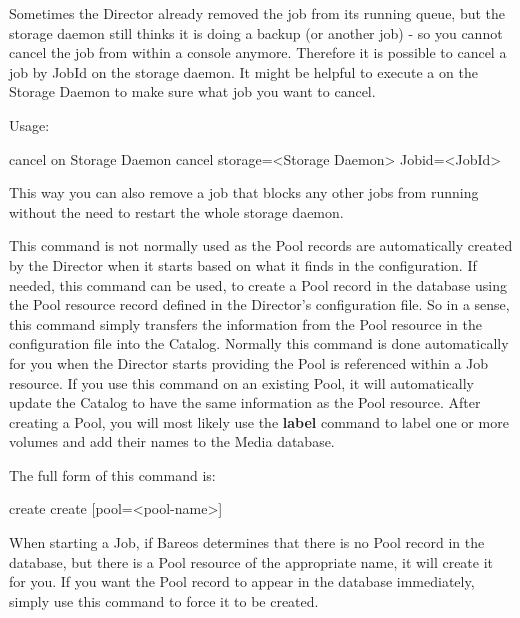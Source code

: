 \begin{description}
   Sometimes the Director already removed the job from its running queue, but the storage daemon still thinks it is doing a backup (or another job) - so you cannot cancel the job from within a console anymore. Therefore it is possible to cancel a job by JobId on the storage daemon. It might be helpful to execute a  on the Storage Daemon to make sure what job you want to cancel.

   Usage:
\begin{bconsole}{cancel on Storage Daemon}
cancel storage=<Storage Daemon> Jobid=<JobId>
\end{bconsole}

   This way you can also remove a job that blocks any other jobs from running without the need to restart the whole storage daemon.

\item [create]
   This command is not normally used as the Pool records are automatically
   created by the Director when it starts based on what it finds in
   the configuration.  If needed, this command can be used,
   to create a Pool record in the database using the
   Pool resource record defined in the Director's configuration file.  So
   in a sense, this command simply transfers the information from the Pool
   resource in the configuration file into the Catalog.  Normally this
   command is done automatically for you when the Director starts providing
   the Pool is referenced within a Job resource.  If you use this command
   on an existing Pool, it will automatically update the Catalog to have
   the same information as the Pool resource.  After creating a Pool, you
   will most likely use the {\bf label} command to label one or more
   volumes and add their names to the Media database.

   The full form of this command is:

\begin{bconsole}{create}
create [pool=<pool-name>]
\end{bconsole}

   When starting a Job, if Bareos determines that there is no Pool record
   in the database, but there is a Pool resource of the appropriate name,
   it will create it for you.  If you want the Pool record to appear in the
   database immediately, simply use this command to force it to be created.

\item[configure]
    \label{sec:bcommandConfigure}


\end{description}
